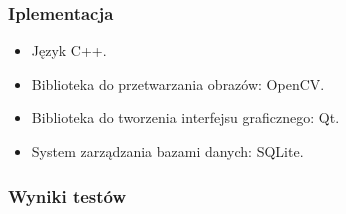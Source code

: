 \documentclass{beamer}
\begin{document}
\begin{frame}
\frametitle{Iplementacja}
\begin{itemize}
\item Język C++.
\item Biblioteka do przetwarzania obrazów: OpenCV.
\item Biblioteka do tworzenia interfejsu graficznego: Qt.
\item System zarządzania bazami danych: SQLite.
\end{itemize}
\end{frame}


\begin{frame}
\frametitle{Wyniki testów}
\begin{table}
\begin{center}
\label{tab:druga1}
\begin{tabular}{|c|c|c|c|c|c|c|c|c|c|c|c|c|c|c|c|c|c|c|l|}
\hline


\end{tabular}
\end{center}
\end{table}
\end{frame}
\end{document}
